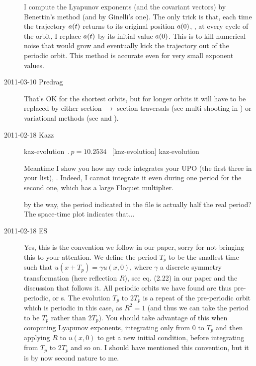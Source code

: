 \begin{description}
I compute the Lyapunov exponents (and the covariant vectors)
by Benettin's method (and by Ginelli's one). The only trick is that, each time
the trajectory $\ssp(t)$ returns to its original position $\ssp(0)$, \ie, at every cycle
of the orbit, I replace $\ssp(t)$ by its initial value $\ssp(0)$. This is to kill
numerical noise that would grow and eventually kick the trajectory
out of the periodic orbit. This method is accurate even for very small
exponent values.

\renewcommand{\ssp}{a}

\item[2011-03-10 Predrag] That's OK for the shortest orbits, but
for longer orbits it will have to be replaced by either section $\to$
section traversals (see multi-shooting in
) or variational methods (see
 and
).

\item[2011-02-18 Kazz]

{kaz-evolution}   %
{}   %
{    %
$\period{p}=10.2534$ \po\ [kaz-evolution]
}
{kaz-evolution}   %


Meantime I show you how my code integrates your UPO (the first three in your
list), . Indeed, I cannot integrate
it even during one period for the second one, which has a large
Floquet multiplier.

by the way, the period indicated in the file is actually half the real period?
The space-time plot indicates that...

\item[2011-02-18 ES]

Yes, this is the convention we follow in our paper, sorry for not
bringing this to your attention. We define the period $T_p$ to be the
smallest time such that $u(x+T_p)=\gamma u(x,0)$, where $\gamma$ a
discrete symmetry transformation (here reflection $R$), see eq. (2.22) in
our paper and the discussion that follows it. All periodic orbits we
have found are thus pre-periodic, or \rpo s.
The evolution
$T_p$ to $2T_p$ is a repeat of the pre-periodic orbit which
is periodic in this case, as $R^2=1$ (and thus we can take the period to be $T_p$
rather than $2T_p$). You should take advantage of this
when computing Lyapunov exponents, integrating only from $0$ to $T_p$ and
then applying $R$ to $u(x,0)$ to get a new initial condition, before
integrating from $T_p$ to $2T_p$ and so on. I should have mentioned this
convention, but it is by now second nature to me.


\end{description}
